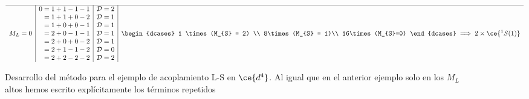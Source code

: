 \begin{figure}[H]
\begin{center}
\begin{align*}
\begin{array}{c | c | c | c}
 \hline 
   M_{L} = 0 & 
     \begin{aligned}
       0 &= 1 + 1 - 1 - 1\\
         &= 1 + 1 + 0 - 2\\
         &= 1 + 0 + 0 - 1\\
         &= 2 + 0 - 1 - 1\\
         &= 2 + 0 + 0 - 2\\
         &= 2 + 1 - 1 - 2\\
         &= 2 + 2 - 2 - 2 
     \end{aligned} 
     & \begin{aligned}
       \mathcal{D} &= 2\\ 
       \mathcal{D} &= 1\\
       \mathcal{D} &= 1\\
       \mathcal{D} &= 1\\
       \mathcal{D} &= 1\\
       \mathcal{D} &= 0\\
       \mathcal{D} &= 2
     \end{aligned} & \begin{dcases}
      1 \times (M_{S} = 2) \\
      8\times (M_{S} = 1)\\
      16\times(M_{S}=0) 
   \end{dcases}  \implies 2\times\ce{^{1}S(1)} \\ 
      \end{array}
\end{align*}
  \end{center}
  \caption{\justifying Desarrollo del método para el ejemplo de acoplamiento L-S en $\ce{d^{4}}$. Al igual que en el anterior ejemplo solo en los $M_{L}$ altos hemos escrito explícitamente los términos repetidos}\label{fig:ejemplo4e}
\end{figure}


